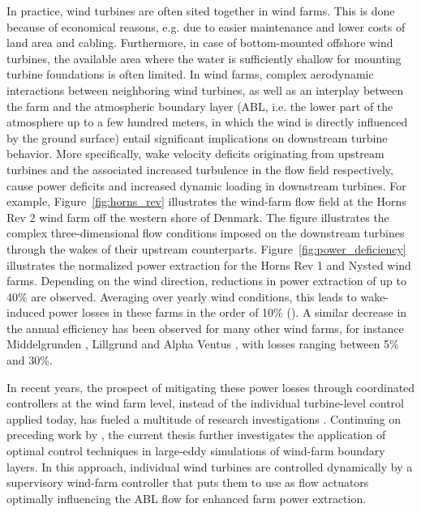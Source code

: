 In practice, wind turbines are often sited together in wind farms. This is done because of economical reasons, e.g. due to easier maintenance and lower costs of land area and cabling. Furthermore, in case of bottom-mounted offshore wind turbines, the available area where the water is sufficiently shallow for mounting turbine foundations is often limited. In wind farms, complex aerodynamic interactions between neighboring wind turbines, as well as an interplay between the farm and the atmospheric boundary layer (ABL, i.e. the lower part of the atmosphere up to a few hundred meters, in which the wind is directly influenced by the ground surface) entail significant implications on downstream turbine behavior. More specifically, wake velocity deficits originating from upstream turbines and the associated increased turbulence in the flow field respectively, cause power deficits and increased dynamic loading in downstream turbines. For example, Figure~\ref{fig:horns_rev} illustrates the wind-farm flow field at the Horns Rev 2 wind farm off the western shore of Denmark. The figure illustrates the complex three-dimensional flow conditions imposed on the downstream turbines through the wakes of their upstream counterparts. Figure~\ref{fig:power_deficiency} illustrates the normalized power extraction for the Horns Rev 1 and Nysted wind farms. Depending on the wind direction, reductions in power extraction of up to 40\% are observed. Averaging over yearly wind conditions, this leads to wake-induced power losses in these farms in the order of 10\% (\citealt{jensen2005wake, barthelmie2010evaluation,barthelmie2010quantifying}). A similar decrease in the annual efficiency has been observed for many other wind farms, for instance Middelgrunden \citep{barthelmie2007modeling2}, Lillgrund \citep{dahlberg2009assessment} and Alpha Ventus \citep{westerhelweg2014wake},  with losses ranging between 5\% and 30\%.

In recent years, the prospect of mitigating these power losses through coordinated controllers at the wind farm level, instead of the individual turbine-level control applied today, has fueled a multitude of research investigations \citep{knudsen2015survey,boersma2017tutorial}. Continuing on preceding work by \cite{goit2015optimal}, the current thesis further investigates the application of optimal control techniques in large-eddy simulations of wind-farm boundary layers. In this approach, individual wind turbines are controlled dynamically by a supervisory wind-farm controller that puts them to use as flow actuators optimally influencing the ABL flow for enhanced farm power extraction. 

